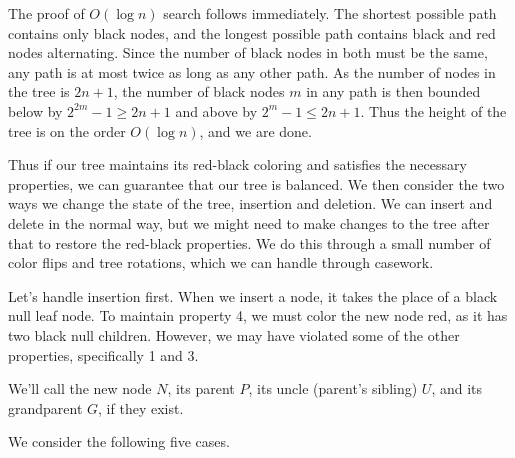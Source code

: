 \documentclass[11pt]{book}
\begin{document}
The proof of $O(\log{n})$ search follows immediately. The shortest possible path contains only black nodes, and the longest possible path contains black and red nodes alternating. Since the number of black nodes in both must be the same, any path is at most twice as long as any other path. As the number of nodes in the tree is $2n+1$, the number of black nodes $m$ in any path is then bounded below by $2^{2m} - 1 \ge 2n + 1$ and above by $2^{m} - 1 \le 2n + 1$. Thus the height of the tree is on the order $O(\log{n})$, and we are done.

Thus if our tree maintains its red-black coloring and satisfies the necessary properties, we can guarantee that our tree is balanced. We then consider the two ways we change the state of the tree, insertion and deletion. We can insert and delete in the normal way, but we might need to make changes to the tree after that to restore the red-black properties. We do this through a small number of color flips and tree rotations, which we can handle through casework.

Let's handle insertion first. When we insert a node, it takes the place of a black null leaf node. To maintain property 4, we must color the new node red, as it has two black null children. However, we may have violated some of the other properties, specifically 1 and 3.

We'll call the new node $N$, its parent $P$, its uncle (parent's sibling) $U$, and its grandparent $G$, if they exist.

We consider the following five cases.
\end{document}
